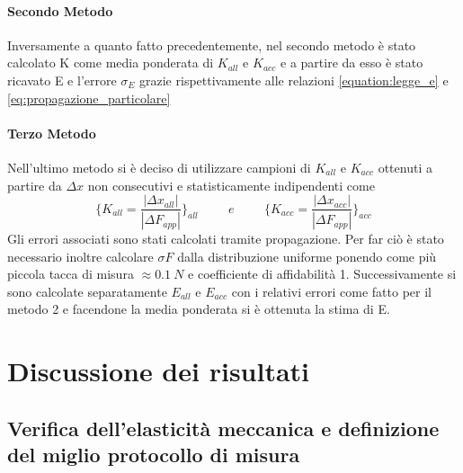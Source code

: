 \documentclass[a4paper,11pt,oneside]{article}
\begin{document}
\paragraph{Secondo Metodo} Inversamente a quanto fatto precedentemente, nel secondo metodo è stato calcolato K come media ponderata di $K_{all}$ e $K_{acc}$ e a partire da esso è stato ricavato E e l'errore $\sigma_{E}$ grazie rispettivamente alle relazioni \ref{equation:legge_e} e \ref{eq:propagazione_particolare}

\paragraph{Terzo Metodo} Nell'ultimo metodo si è deciso di utilizzare campioni di $K_{all}$ e $K_{acc}$ ottenuti a partire da $\Delta x$  non consecutivi e statisticamente indipendenti come 
\begin{equation*}
    \biggl\{ K_{all} = \frac{|\Delta x_{all}|}{|\Delta F_{app}|}\biggr\}_{all}
    \hspace{1cm} e \hspace{1cm}
    \biggl\{ K_{acc} = \frac{|\Delta x_{acc}|}{|\Delta F_{app}|}\biggr\}_{acc}
\end{equation*}
Gli errori associati sono stati calcolati tramite propagazione. Per far ciò è stato necessario inoltre calcolare $\sigma F$ dalla distribuzione uniforme ponendo come più piccola tacca di misura $\approx \SI{0.1}{N}$ e coefficiente di affidabilità 1. Successivamente si sono calcolate separatamente $E_{all}$ e $E_{acc}$ con i relativi errori come fatto per il metodo 2 e facendone la media ponderata si è ottenuta la stima di E.


\newpage

\section{Discussione dei risultati}
\subsection{Verifica dell'elasticità meccanica e definizione del miglio protocollo di misura}
\end{document}
